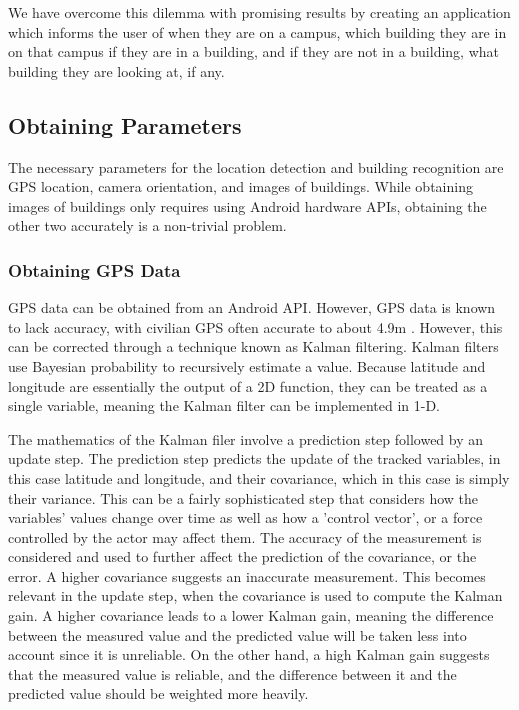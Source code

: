 \documentclass[12pt,journal,compsoc]{IEEEtran}
\begin{document}
We have overcome this dilemma with promising results by creating an application which informs the user of when they are on a campus, which building they are in on that campus if they are in a building, and if they are not in a building, what building they are looking at, if any.  

\subsection{Obtaining Parameters}

The necessary parameters for the location detection and building recognition are GPS location, camera orientation, and images of buildings. While obtaining images of buildings only requires using Android hardware APIs, obtaining the other two accurately is a non-trivial problem.

\subsubsection{Obtaining GPS Data}

GPS data can be obtained from an Android API. However, GPS data is known to lack accuracy, with civilian GPS often accurate to about 4.9m \cite{gps_accuracy}. However, this can be corrected through a technique known as Kalman filtering. Kalman filters use Bayesian probability to recursively estimate a value. Because latitude and longitude are essentially the output of a 2D function, they can be treated as a single variable, meaning the Kalman filter can be implemented in 1-D. 

The mathematics of the Kalman filer involve a prediction step followed by an update step. The prediction step predicts the update of the tracked variables, in this case latitude and longitude, and their covariance, which in this case is simply their variance. This can be a fairly sophisticated step that considers how the variables' values change over time as well as how a 'control vector', or a force controlled by the actor may affect them. The accuracy of the measurement is considered and used to further affect the prediction of the covariance, or the error. A higher covariance suggests an inaccurate measurement. This becomes relevant in the update step, when the covariance is used to compute the Kalman gain. A higher covariance leads to a lower Kalman gain, meaning the difference between the measured value and the predicted value will be taken less into account since it is unreliable. On the other hand, a high Kalman gain suggests that the measured value is reliable, and the difference between it and the predicted value should be weighted more heavily. 
\end{document}
